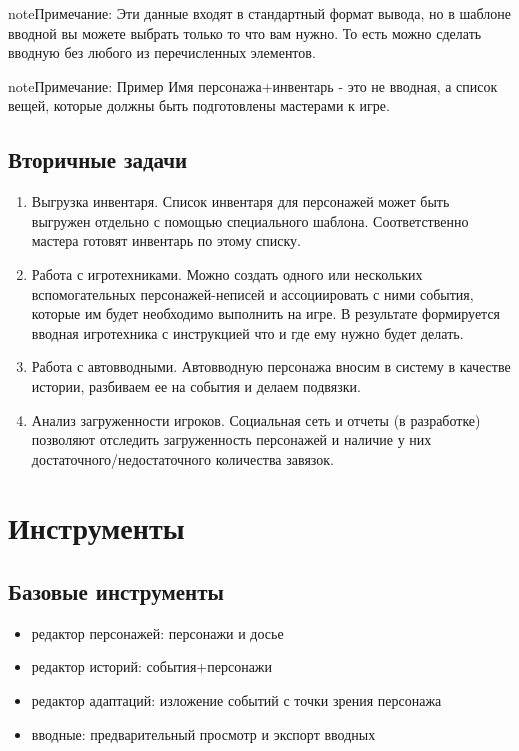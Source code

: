\documentclass[a4paper,oneside,10pt,russian]{sphinxmanual}
\begin{document}
\begin{notice}{note}{Примечание:}
Эти данные входят в стандартный формат вывода, но в шаблоне вводной вы можете выбрать только то что вам нужно. То есть можно сделать вводную без любого из перечисленных элементов.
\end{notice}

\begin{notice}{note}{Примечание:}
Пример
Имя персонажа+инвентарь - это не вводная, а список вещей, которые должны быть подготовлены мастерами к игре.
\end{notice}


\section{Вторичные задачи}
\label{tasks:id3}\begin{enumerate}
\item {}
Выгрузка инвентаря. Список инвентаря для персонажей может быть выгружен отдельно с помощью специального шаблона. Соответственно мастера готовят инвентарь по этому списку.

\item {}
Работа с игротехниками. Можно создать одного или нескольких вспомогательных персонажей-неписей и ассоциировать с ними события, которые им будет необходимо выполнить на игре. В результате формируется вводная игротехника с инструкцией что и где ему нужно будет делать.

\item {}
Работа с автовводными. Автовводную персонажа вносим в систему в качестве истории, разбиваем ее на события и делаем подвязки.

\item {}
Анализ загруженности игроков. Социальная сеть и отчеты (в разработке) позволяют отследить загруженность персонажей и наличие у них достаточного/недостаточного количества завязок.

\end{enumerate}


\chapter{Инструменты}
\label{toolsEnum::doc}\label{toolsEnum:id1}

\section{Базовые инструменты}
\label{toolsEnum:id2}\begin{itemize}
\item {}
редактор персонажей: персонажи и досье

\item {}
редактор историй: события+персонажи

\item {}
редактор адаптаций: изложение событий с точки зрения персонажа

\item {}
вводные: предварительный просмотр и экспорт вводных

\end{itemize}
\end{document}
